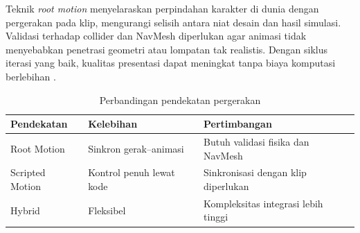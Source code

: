 \documentclass[../main.tex]{subfiles}
\begin{document}
Teknik \textit{root motion} menyelaraskan perpindahan karakter di dunia dengan pergerakan pada klip, mengurangi selisih antara niat desain dan hasil simulasi. Validasi terhadap collider dan NavMesh diperlukan agar animasi tidak menyebabkan penetrasi geometri atau lompatan tak realistis. Dengan siklus iterasi yang baik, kualitas presentasi dapat meningkat tanpa biaya komputasi berlebihan \parencite{unity-animator,unity-state-machines}.

\begin{table}[h]
  \centering
  \caption{Perbandingan pendekatan pergerakan}
  \begin{tabularx}{\textwidth}{@{}lXX@{}}
    \toprule
    Pendekatan & Kelebihan & Pertimbangan \\
    \midrule
    Root Motion & Sinkron gerak–animasi & Butuh validasi fisika dan NavMesh \\
    Scripted Motion & Kontrol penuh lewat kode & Sinkronisasi dengan klip diperlukan \\
    Hybrid & Fleksibel & Kompleksitas integrasi lebih tinggi \\
    \bottomrule
  \end{tabularx}
\end{table}

\onlyinsubfile{\printbibliography}
\end{document}
